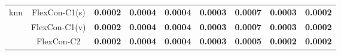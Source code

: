\begin{table}[h]
{\begin{tabular}{|c|c|c|c|c|c|c|c|c|}
                    \multirow{3}{*}{\ac{knn}}
                     & FlexCon-C1(s) & \textbf{0.0002} & \textbf{0.0004} & \textbf{0.0004} & \textbf{0.0003} & \textbf{0.0007} & \textbf{0.0003} & \textbf{0.0002} \\
                     & FlexCon-C1(v) & \textbf{0.0002} & \textbf{0.0004} & \textbf{0.0004} & \textbf{0.0003} & \textbf{0.0007} & \textbf{0.0003} & \textbf{0.0002} \\
                     & FlexCon-C2    & \textbf{0.0002} & \textbf{0.0004} & \textbf{0.0004} & \textbf{0.0003} & \textbf{0.0005} & \textbf{0.0002} & \textbf{0.0002} \\ \hline
                \end{tabular}%
            }
        \end{table}


        

